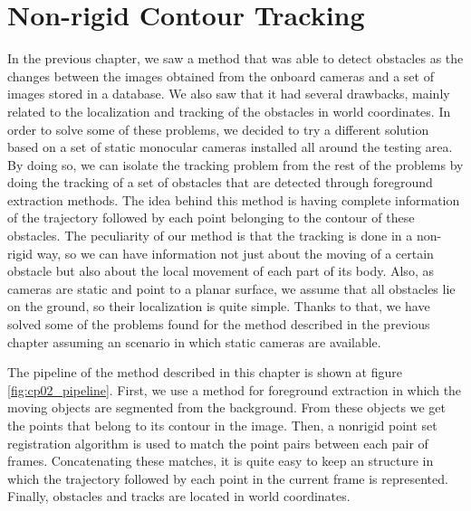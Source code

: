 
\graphicspath{{./images/chapter02/bmps/}{./images/chapter02/vects/}{./images/chapter02/}}

\chapter{Non-rigid Contour Tracking}\label{ch:chapter02}

In the previous chapter, we saw a method that was able to detect obstacles as the changes between the images obtained from the onboard cameras and a set of images stored in a database. We also saw that it had several drawbacks, mainly related to the localization and tracking of the obstacles in world coordinates. In order to solve some of these problems, we decided to try a different solution based on a set of static monocular cameras installed all around the testing area. By doing so, we can isolate the tracking problem from the rest of the problems by doing the tracking of a set of obstacles that are detected through foreground extraction methods.
The idea behind this method is having complete information of the trajectory followed by each point belonging to the contour of these obstacles. The peculiarity of our method is that the tracking is done in a non-rigid way, so we can have information not just about the moving of a certain obstacle but also about the local movement of each part of its body.
Also, as cameras are static and point to a planar surface, we assume that all obstacles lie on the ground, so their localization is quite simple. Thanks to that, we have solved some of the problems found for the method described in the previous chapter assuming an scenario in which static cameras are available. 

The pipeline of the method described in this chapter is shown at figure \ref{fig:cp02_pipeline}. First, we use a method for foreground extraction in which the moving objects are segmented from the background. From these objects we get the points that belong to its contour in the image. Then, a nonrigid point set registration algorithm is used to match the point pairs between each pair of frames. Concatenating these matches, it is quite easy to keep an structure in which the trajectory followed by each point in the current frame is represented. Finally, obstacles and tracks are located in world coordinates.

